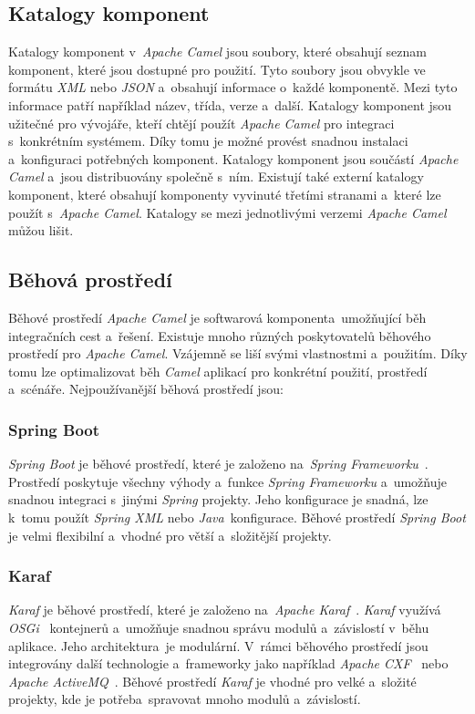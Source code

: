 \subsection{Katalogy komponent}
\label{camelKatalogyKomponent}
Katalogy komponent v~\emph{Apache Camel} jsou soubory, které obsahují seznam komponent, které jsou dostupné pro použití. Tyto soubory jsou obvykle ve formátu \emph{XML} nebo \emph{JSON} a~obsahují informace o~každé komponentě. Mezi tyto informace patří například název, třída, verze a~další. Katalogy komponent jsou užitečné pro vývojáře, kteří chtějí použít \emph{Apache Camel} pro integraci s~konkrétním systémem. Díky tomu je možné provést snadnou instalaci a~konfiguraci potřebných komponent. Katalogy komponent jsou součástí \emph{Apache Camel} a~jsou distribuovány společně s~ním. Existují také externí katalogy komponent, které obsahují komponenty vyvinuté třetími stranami a~které lze použít s~\emph{Apache Camel}. Katalogy se mezi jednotlivými verzemi \emph{Apache Camel} můžou lišit.

\subsection{Běhová prostředí}
\label{camelBehovaProstredi}
Běhové prostředí \emph{Apache Camel} je softwarová komponenta~umožňující běh integračních cest a~řešení. Existuje mnoho různých poskytovatelů běhového prostředí pro \emph{Apache Camel}. Vzájemně se liší svými vlastnostmi a~použitím. Díky tomu lze optimalizovat běh \emph{Camel} aplikací pro konkrétní použití, prostředí a~scénáře. Nejpoužívanější běhová prostředí jsou:

\subsubsection{Spring Boot}
\emph{Spring Boot} je běhové prostředí, které je založeno na~\emph{Spring Frameworku}~\cite{SpringFramework}. Prostředí poskytuje všechny výhody a~funkce \emph{Spring Frameworku} a~umožňuje snadnou integraci s~jinými \emph{Spring} projekty. Jeho konfigurace je snadná, lze k~tomu použít \emph{Spring XML} nebo \emph{Java}~konfigurace. Běhové prostředí \emph{Spring Boot} je velmi flexibilní a~vhodné pro větší a~složitější projekty.

\subsubsection{Karaf}
\emph{Karaf} je běhové prostředí, které je založeno na~\emph{Apache Karaf}~\cite{ApacheKaraf}. \emph{Karaf} využívá \emph{OSGi}~\cite{OSGi} kontejnerů a~umožňuje snadnou správu modulů a~závislostí v~běhu aplikace. Jeho architektura~je modulární. V~rámci běhového prostředí jsou integrovány další technologie a~frameworky jako například \emph{Apache CXF}~\cite{ApacheCXF} nebo \emph{Apache ActiveMQ}~\cite{ApacheActiveMQ}. Běhové prostředí \emph{Karaf} je vhodné pro velké a~složité projekty, kde je potřeba~spravovat mnoho modulů a~závislostí.

